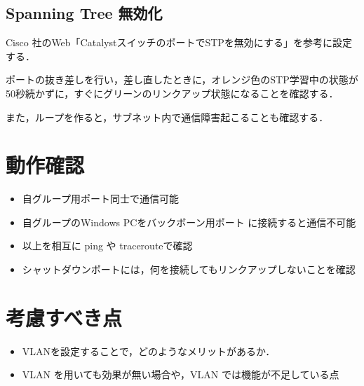\subsection{Spanning Tree 無効化}

Cisco 社のWeb「CatalystスイッチのポートでSTPを無効にする」を参考に設定する．

ポートの抜き差しを行い，差し直したときに，オレンジ色のSTP学習中の状態が50秒続かずに，すぐにグリーンのリンクアップ状態になることを確認する．

また，ループを作ると，サブネット内で通信障害起こることも確認する．



\section{動作確認}

\begin{itemize}
 \item 自グループ用ポート同士で通信可能
 \item 自グループのWindows PCをバックボーン用ポート
       に接続すると通信不可能
 \item 以上を相互に ping や tracerouteで確認
 \item シャットダウンポートには，何を接続してもリンクアップしないことを確認
\end{itemize}

\section{考慮すべき点}

\begin{itemize}
 \item VLANを設定することで，どのようなメリットがあるか．
 \item VLAN を用いても効果が無い場合や，VLAN では機能が不足している点
\end{itemize}
